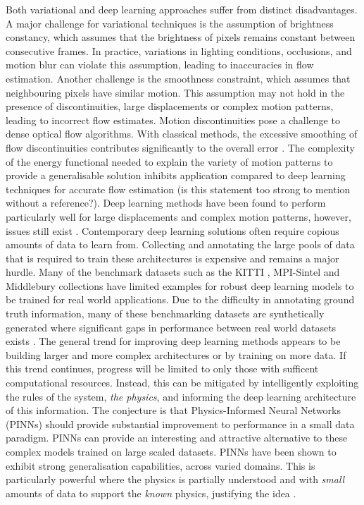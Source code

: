 \IEEEPARstart{}{} Both variational and deep learning approaches suffer from distinct disadvantages. A major challenge for variational techniques is the assumption of brightness constancy, which assumes that the brightness of pixels remains constant between consecutive frames. In practice, variations in lighting conditions, occlusions, and motion blur can violate this assumption, leading to inaccuracies in flow estimation. Another challenge is the smoothness constraint, which assumes that neighbouring pixels have similar motion. This assumption may not hold in the presence of discontinuities, large displacements or complex motion patterns, leading to incorrect flow estimates. Motion discontinuities pose a challenge to dense optical flow algorithms. With classical methods, the excessive smoothing of flow discontinuities contributes significantly to the overall error \cite{amiaz2006piecewise}. The complexity of the energy functional needed to explain the variety of motion patterns to provide a generalisable solution inhibits application compared to deep learning techniques for accurate flow estimation \color{red}(is this statement too strong to mention without a reference?)\color{black}.
\IEEEPARstart{}{} Deep learning methods have been found to perform particularly well for large displacements and complex motion patterns, however, issues still exist \cite{ilg2017flownet}. Contemporary deep learning solutions often require copious amounts of data to learn from. Collecting and annotating the large pools of data that is required to train these architectures is expensive and remains a major hurdle. Many of the benchmark datasets such as the KITTI \cite{geiger2012we}, MPI-Sintel \cite{butler2012naturalistic} and Middlebury \cite{baker2011database} collections have limited examples for robust deep learning models to be trained for real world applications. Due to the difficulty in annotating ground truth information, many of these benchmarking datasets are synthetically generated where significant gaps in performance between real world datasets exists \cite{nikolenko2021synthetic}. 
\IEEEPARstart{} The general trend for improving deep learning methods appears to be building larger and more complex architectures or by training on more data. If this trend continues, progress will be limited to only those with sufficent computational resources. Instead, this can be mitigated by intelligently exploiting the rules of the system, \textit{the physics}, and informing the deep learning architecture of this information. The conjecture is that Physics-Informed Neural Networks (PINNs) should provide substantial improvement to performance in a small data paradigm. PINNs can provide an interesting and attractive alternative to these complex models trained on large scaled datasets. PINNs have been shown to exhibit strong generalisation capabilities, across varied domains. This is particularly powerful where the physics is partially understood and with \textit{small} amounts of data to support the \textit{known} physics, justifying the idea \cite{raissi2017physics,raissi2017machine,grigo2019physics,karniadakis2021physics}.
